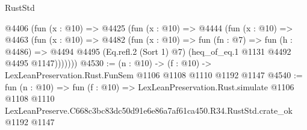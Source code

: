 \begin{lexlean}{RustStd}
\begin{coremodule}
    @4406
      (fun (x : @10) =>
      @4425
        (fun (x : @10) =>
        @4444
          (fun (x : @10) =>
          @4463
            (fun (x : @10) =>
            @4482
              (fun (x : @10) =>
              fun (fn : @7) =>
              fun (h : @4486) =>
              @4494 @4495 (Eq.refl.{2} (Sort 1) @7) (heq_of_eq.{1} @1131 @4492 @4495 @1147)))))))
@4530 := (n : @10) -> (f : @10) -> LexLeanPreservation.Rust.FunSem @1106 @1108 @1110 @1192 @1147
@4540 := fun (n : @10) =>
  fun (f : @10) =>
  LexLeanPreservation.Rust.simulate
    @1106
    @1108
    @1110
    LexLeanPreserve.C668c3bc83dc50d91e6e86a7af61ca450.R34.RustStd.crate_ok
    @1192
    @1147
\end{coremodule}
\end{lexlean}
